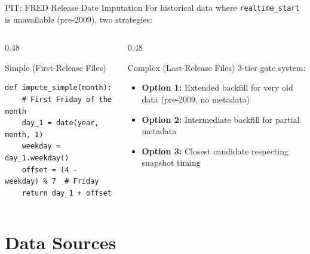 \documentclass[aspectratio=169,10pt]{beamer}
\begin{document}
\begin{frame}[fragile]{PIT: FRED Release Date Imputation}
For historical data where \texttt{realtime\_start} is unavailable (pre-2009), two strategies:

\vspace{0.2cm}
\begin{columns}[T]
\begin{column}{0.48\textwidth}
\begin{block}{Simple (First-Release Files)}
\begin{lstlisting}[style=pseudo]
def impute_simple(month):
    # First Friday of the month
    day_1 = date(year, month, 1)
    weekday = day_1.weekday()
    offset = (4 - weekday) % 7  # Friday
    return day_1 + offset
\end{lstlisting}
\end{block}
\end{column}
\begin{column}{0.48\textwidth}
\begin{block}{Complex (Last-Release Files)}
3-tier gate system:
\begin{itemize}\footnotesize
  \item \textbf{Option 1:} Extended backfill for very old data (pre-2009, no metadata)
  \item \textbf{Option 2:} Intermediate backfill for partial metadata
  \item \textbf{Option 3:} Closest candidate respecting snapshot timing
\end{itemize}
\end{block}
\end{column}
\end{columns}
\end{frame}

\section{Data Sources}
\end{document}
